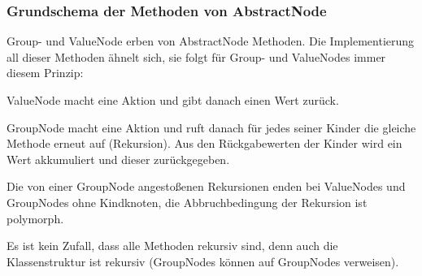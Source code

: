 \subsubsection{Grundschema der Methoden von AbstractNode}
\label{sec:RekursiveMethoden}
Group- und ValueNode erben von AbstractNode Methoden. Die Implementierung all dieser Methoden ähnelt sich, sie folgt für Group- und ValueNodes immer diesem Prinzip:

ValueNode macht eine Aktion und gibt danach einen Wert zurück.

GroupNode macht eine Aktion und ruft danach für jedes seiner Kinder die gleiche Methode erneut auf (Rekursion). Aus den Rückgabewerten der Kinder wird ein Wert akkumuliert und dieser zurückgegeben.

Die von einer GroupNode angestoßenen Rekursionen enden bei ValueNodes und GroupNodes ohne Kindknoten, die Abbruchbedingung der Rekursion ist polymorph.

Es ist kein Zufall, dass alle Methoden rekursiv sind, denn auch die Klassenstruktur ist rekursiv (GroupNodes können auf GroupNodes verweisen).











